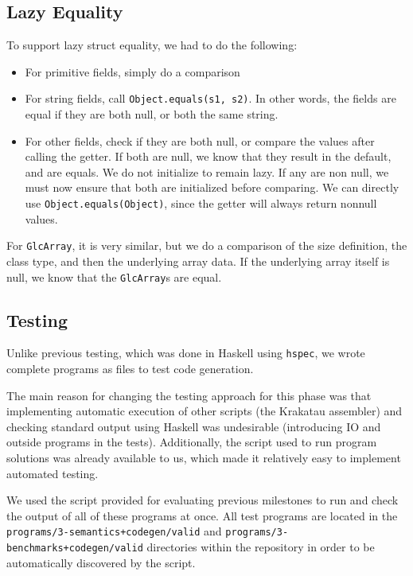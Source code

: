 \documentclass[11pt]{article}
\begin{document}
\subsection{Lazy Equality}
\label{sec:lazy-eq}

To support lazy struct equality, we had to do the following:

\begin{itemize}
	\item For primitive fields, simply do a comparison
	\item For string fields, call \texttt{Object.equals(s1, s2)}. In other words, the fields are equal if they are both null, or both the same string.
	\item For other fields, check if they are both null, or compare the values after calling the getter. If both are null, we know that they result in the default, and are equals. We do not initialize to remain lazy. If any are non null, we must now ensure that both are initialized before comparing. We can directly use \texttt{Object.equals(Object)}, since the getter will always return nonnull values.
\end{itemize}

For \texttt{GlcArray}, it is very similar, but we do a comparison of the size definition, the class type, and then the underlying array data.
If the underlying array itself is null, we know that the \texttt{GlcArray}s are equal.

\subsection{Testing}
Unlike previous testing, which was done in Haskell using \texttt{hspec}, we
wrote complete programs as files to test code generation.

The main reason for changing the testing approach for this phase was
that
implementing automatic execution of other scripts (the Krakatau assembler) and
checking standard output using Haskell was undesirable (introducing IO
and outside programs in the tests). Additionally, the script used to run
program solutions was already available to us, which made it relatively easy
to implement automated testing.

We used the script provided for evaluating previous milestones to run and check
the output of all of these programs at once. All test programs are located
in the \texttt{programs/3-semantics+codegen/valid} and
\texttt{programs/3-benchmarks+codegen/valid} directories within the repository
in order to be automatically discovered by the script.
\end{document}
